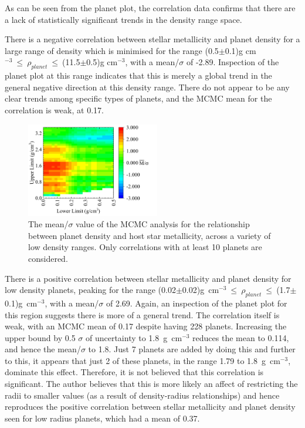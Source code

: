 \documentclass[a4paper,twocolumn,12pt]{article}
\begin{document}
As can be seen from the planet plot, the correlation data confirms that there are a lack of statistically significant trends in the density range space.

There is a negative correlation between stellar metallicity and planet density for a large range of density which is minimised for the range (0.5$\pm$0.1)g cm$^{-3}~\leq~\rho_{planet}~\leq~$(11.5$\pm$0.5)g cm$^{-3}$, with a mean/$\sigma$ of -2.89. Inspection of the planet plot at this range indicates that this is merely a global trend in the general negative direction at this density range. There do not appear to be any clear trends among specific types of planets, and the MCMC mean for the correlation is weak, at 0.17.

\begin{figure}[h!]
    \centering
    \includegraphics[width=0.52\textwidth]{Graphs/FeH vs Density correlations - Density ranges (low).pdf}
    \caption{The mean/$\sigma$ value of the MCMC analysis for the relationship between planet density and host star metallicity, across a variety of low density ranges. Only correlations with at least 10 planets are considered.}
    \label{figure: Fe/H vs Density correlations - Density ranges (Low)}
\end{figure}

There is a positive correlation between stellar metallicity and planet density for low density planets, peaking for the range (0.02$\pm$0.02)g~cm$^{-3}~\leq~\rho_{planet}~\leq~$(1.7$\pm$0.1)g~cm$^{-3}$, with a mean/$\sigma$ of 2.69. Again, an inspection of the planet plot for this region suggests there is more of a general trend. The correlation itself is weak, with an MCMC mean of 0.17 despite having 228 planets. Increasing the upper bound by 0.5 $\sigma$ of uncertainty to 1.8~g~cm$^{-3}$ reduces the mean to 0.114, and hence the mean/$\sigma$ to 1.8. Just 7 planets are added by doing this and further to this, it appears that just 2 of these planets, in the range 1.79 to 1.8~g~cm$^{-3}$, dominate this effect. Therefore, it is not believed that this correlation is significant. The author believes that this is more likely an affect of restricting the radii to smaller values (as a result of density-radius relationships) and hence reproduces the positive correlation between stellar metallicity and planet density seen for low radius planets, which had a mean of 0.37.
\end{document}
